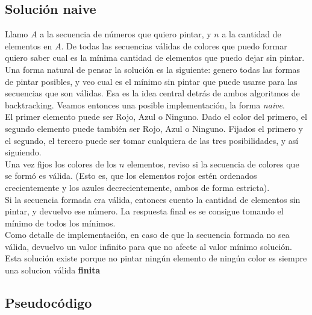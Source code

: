 \subsection{Solución naive}

Llamo $A$ a la secuencia de números que quiero pintar, y $n$ a la cantidad de elementos en $A$. De todas las secuencias válidas de colores que puedo formar quiero saber cual es la mínima cantidad de elementos que puedo dejar sin pintar. \\

Una forma natural de pensar la solución es la siguiente: genero todas las formas de pintar posibles, y veo cual es el mínimo sin pintar que puede usarse para las secuencias que son válidas. Esa es la idea central detrás de ambos algoritmos de backtracking. Veamos entonces una posible implementación, la forma \textit{naive}. \\

El primer elemento puede ser Rojo, Azul o Ninguno. Dado el color del primero, el segundo elemento puede también ser Rojo, Azul o Ninguno. Fijados el primero y el segundo, el tercero puede ser tomar cualquiera de las tres posibilidades, y así siguiendo. \\

Una vez fijos los colores de los $n$ elementos, reviso si la secuencia de colores que se formó es válida. (Esto es, que los elementos rojos estén ordenados crecientemente y los azules decrecientemente, ambos de forma estricta). \\

Si la secuencia formada era válida, entonces cuento la cantidad de elementos sin pintar, y devuelvo ese número. La respuesta final es se consigue tomando el mínimo de todos los mínimos. \\

Como detalle de implementación, en caso de que la secuencia formada no sea válida, devuelvo un valor infinito para que no afecte al valor mínimo solución. Esta solución existe porque no pintar ningún elemento de ningún color es siempre una solucion válida \textbf{finita}


\subsection{Pseudocódigo}

